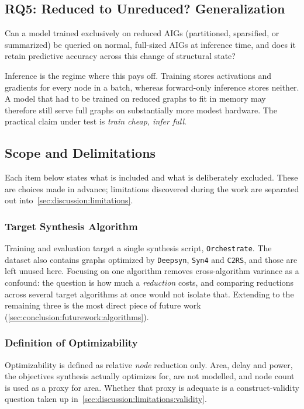 \subsection{RQ5: Reduced to Unreduced? Generalization}
\label{sec:intro:rq5}
Can a model trained exclusively on reduced AIGs (partitioned, sparsified, or summarized) be
queried on normal, full-sized AIGs at inference time, and does it retain predictive accuracy
across this change of structural state?

Inference is the regime where this pays off. Training stores activations and gradients for
every node in a batch, whereas forward-only inference stores neither. A model that had to be
trained on reduced graphs to fit in memory may therefore still serve full graphs on
substantially more modest hardware. The practical claim under test is \emph{train cheap,
infer full}.


\subsection{Scope and Delimitations}
\label{sec:intro:rqs:scope}
Each item below states what is included and what is deliberately excluded. These are
choices made in advance; limitations discovered during the work are separated out
into~\ref{sec:discussion:limitations}.

\subsubsection{Target Synthesis Algorithm}
\label{sec:intro:scope:algorithm}
Training and evaluation target a single synthesis script, \texttt{Orchestrate}. The dataset
also contains graphs optimized by \texttt{Deepsyn}, \texttt{Syn4} and \texttt{C2RS}, and
those are left unused here. Focusing on one algorithm removes cross-algorithm variance as a
confound: the question is how much a \emph{reduction} costs, and comparing reductions across
several target algorithms at once would not isolate that. Extending to the remaining three
is the most direct piece of future work (\ref{sec:conclusion:futurework:algorithms}).

\subsubsection{Definition of Optimizability}
\label{sec:intro:scope:target}
Optimizability is defined as relative \emph{node} reduction only. Area, delay and power,
the objectives synthesis actually optimizes for, are not modelled, and node count is used
as a proxy for area. Whether that proxy is adequate is a construct-validity question taken
up in~\ref{sec:discussion:limitations:validity}.

